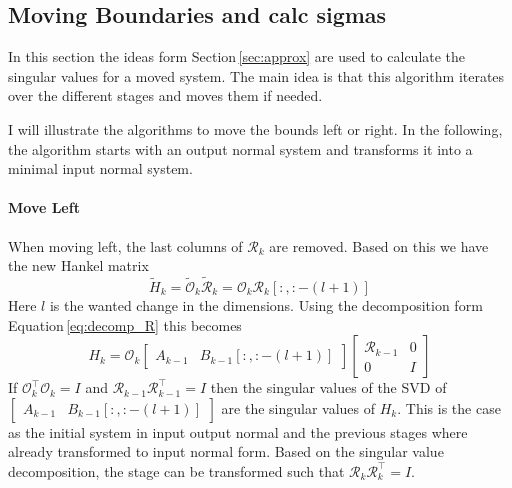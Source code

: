 \documentclass[doctype=mastersthesis,BCOR=15mm,biblatex]{ldvbook}%
\newcommand{\R}{\mathcal{R}} %
\newcommand{\Ob}{\mathcal{O}} %
\newcommand{\eye}{I} %
\begin{document}
\subsection{Moving Boundaries and calc sigmas}\label{subsec:move_sig}
In this section the ideas form Section\,\ref{sec:approx} are used to calculate the singular values for a moved system.
The main idea is that this algorithm iterates over the different stages and moves them if needed.


I will illustrate the algorithms to move the bounds left or right. 
In the following, the algorithm starts with an output normal system and transforms it into a minimal input normal system.


\paragraph{Move Left}
When moving left, the last columns of $\R_{k}$ are removed.
Based on this we have the new Hankel matrix
\begin{equation}
	\tilde{H}_k = \tilde{\Ob}_k \tilde{\R}_k = \Ob_{k}\R_{k}[:,:-(l+1)]
\end{equation}
Here $l$ is the wanted change in the dimensions.
Using the decomposition form Equation\,\ref{eq:decomp_R} this becomes
\begin{equation}
	H_{k}=\Ob_{k}
	\begin{bmatrix}
	A_{k-1}&B_{k-1}[:,:-(l+1)]
	\end{bmatrix}
	\begin{bmatrix}
	\R_{k-1} & 0\\ 0& \eye
	\end{bmatrix}
\end{equation}
If $\Ob_k^\top \Ob_k = \eye$ and $\R_{k-1} \R_{k-1}^\top = \eye$ then the singular values of the SVD of $\begin{bmatrix}
A_{k-1}&B_{k-1}[:,:-(l+1)]
\end{bmatrix}$ are the singular values of $H_k$.
This is the case as the initial system in input output normal and the previous stages where already transformed to input normal form.
Based on the singular value decomposition, the stage can be transformed such that $\R_{k} \R_{k}^\top = \eye$.
\end{document}
